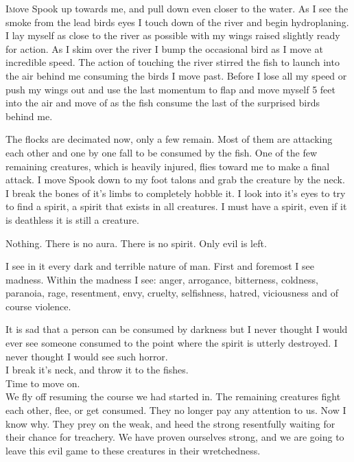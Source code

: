 \lettrine[lines=2,lraise=0]{I} move Spook up towards me, and pull down even closer to the water. As I see the smoke from the lead birds eyes I touch down of the river and begin hydroplaning. I lay myself as close to the river as possible with my wings raised slightly ready for action. As I skim over the river I bump the occasional bird as I move at incredible speed. The action of touching the river stirred the fish to launch into the air behind me consuming the birds I move past. Before I lose all my speed or push my wings out and use the last momentum to flap and move myself 5 feet into the air and move of as the fish consume the last of the surprised birds behind me.

The flocks are decimated now, only a few remain. Most of them are attacking each other and one by one fall to be consumed by the fish. One of the few remaining creatures, which is heavily injured, flies toward me to make a final attack. I move Spook down to my foot talons and grab the creature by the neck. I break the bones of it's limbs to completely hobble it. I look into it's eyes to try to find a spirit, a spirit that exists in all creatures. I must have a spirit, even if it is deathless it is still a creature.

Nothing. There is no aura. There is no spirit. Only evil is left.

I see in it every dark and terrible nature of man. First and foremost I see madness. Within the madness I see: anger, arrogance, bitterness, coldness, paranoia, rage, resentment, envy, cruelty, selfishness, hatred, viciousness and of course violence.

It is sad that a person can be consumed by darkness but I never thought I would ever see someone consumed to the point where the spirit is utterly destroyed. I never thought I would see such horror.\\

I break it's neck, and throw it to the fishes.\\

Time to move on.\\

We fly off resuming the course we had started in. The remaining creatures fight each other, flee, or get consumed. They no longer pay any attention to us. Now I know why. They prey on the weak, and heed the strong resentfully waiting for their chance for treachery. We have proven ourselves strong, and we are going to leave this evil game to these creatures in their wretchedness.

